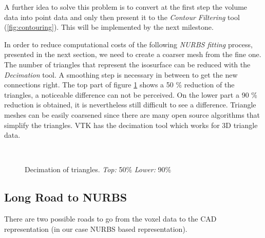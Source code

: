 A further idea to solve this problem is to convert at the first step the volume data into point data
and only then present it to the \textit{Contour Filtering} tool (\autoref{fig:contouring}). This will be implemented by the next
milestone.

In order to reduce computational costs of the following \textit{NURBS fitting} process, presented in the next section, we need to create a coarser mesh from the fine one. The number of triangles that represent the
isosurface can be reduced with the \textit{Decimation} tool. A smoothing step is necessary in between
to get the new connections right. The top part of figure \ref{fig:Decimation} shows a 50 \% reduction of the
triangles, a noticeable difference can not be perceived. On the lower part a 90 \% reduction is
obtained, it is nevertheless still difficult to see a difference. Triangle meshes can be easily
coarsened since there are many open source algorithms that simplify the triangles. VTK has the
decimation tool which works for 3D triangle data.

\begin{figure}
\centering
   \\
   \caption{Decimation of triangles. \textit{Top:} 50\% \textit{Lower:} 90\%}
   \label{fig:Decimation}
\end{figure}

\subsection{Long Road to NURBS}
There are two possible roads to go from the voxel data to the CAD representation (in our case NURBS based representation).

